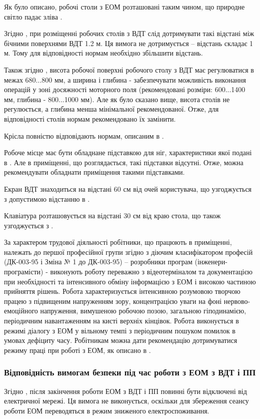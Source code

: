 \documentclass[a4paper,12pt]{article}
\begin{document}
Як було описано, робочі столи з ЕОМ розташовані таким чином, що природне світло падає зліва \cite{sanpin798}.

Згідно \cite{sanpin798}, при розміщенні робочих столів з ВДТ слід дотримувати такі відстані між бічними поверхнями ВДТ 1.2 м. Ця вимога не дотримується -- відстань складає 1 м. Тому для відповідності нормам необхідно збільшити відстань.

Також згідно \cite{sanpin798}, висота робочої поверхні робочого столу з ВДТ має регулюватися в межах 680...800 мм, а ширина і глибина - забезпечувати можливість виконання операцій у зоні досяжності моторного поля (рекомендовані розміри: 600...1400 мм, глибина - 800...1000 мм). Але як було сказано вище, висота столів не регулюється, а глибина менша мінімальної рекомендованої. Отже, для відповідності столів нормам рекомендовано їх замінити.

Крісла повністю відповідають нормам, описаним в \cite{sanpin798}.

Робоче місце має бути обладнане підставкою для ніг, характеристики якої подані в \cite{sanpin798}. Але в приміщенні, що розглядається, такі підставки відсутні. Отже, можна рекомендувати обладнати приміщення такими підставками.

Екран ВДТ знаходиться на відстані 60 см від очей користувача, що узгоджується з допустимою відстанню в \cite{sanpin798}.

Клавіатура розташовується на відстані 30 см від краю стола, що також узгоджується з \cite{sanpin798}.

За характером трудової діяльності робітники, що працюють в приміщенні, належать до першої професійної групи згідно з діючим класифікатором професій (ДК-003-95 і Зміна № 1 до ДК-003-95) -- розробники програм (інженери-програмісти) - виконують роботу переважно з відеотерміналом та документацією при необхідності та інтенсивного обміну інформацією з ЕОМ і високою частиною прийняття рішень. Робота характеризується інтенсивною розумовою творчою працею з підвищеним напруженням зору, концентрацією уваги на фоні нервово-емоційного напруження, вимушеною робочою позою, загальною гіподинамією, періодичним навантаженням на кисті верхніх кінцівок. Робота виконується в режимі діалогу з ЕОМ у вільному темпі з періодичним пошуком помилок в умовах дефіциту часу. Робітникам можна дати рекомендацію дотримуватися режиму праці при роботі з ЕОМ, як описано в \cite{sanpin798}.

\subsubsection{Відповідність вимогам безпеки під час роботи з ЕОМ з ВДТ і ПП}
Згідно \cite{npaop1210}, після закінчення роботи ЕОМ з ВДТ і ПП повинні бути відключені від електричної мережі. Ця вимога не виконується, оскільки для збереження сеансу роботи ЕОМ переводяться в режим зниженого електроспоживання.
\end{document}
